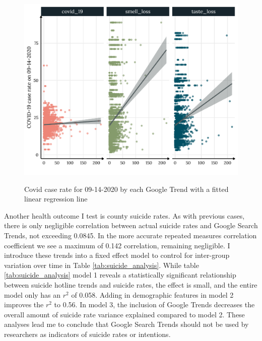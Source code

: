 
\begin{figure}[h]
{\centering \includegraphics[width=0.8\linewidth]{figs/paper1/covid_plot-1.pdf}}
\caption{Covid case rate for 09-14-2020 by each Google Trend with a fitted linear regression line}\label{fig:covid_plot-1}
\end{figure}

Another health outcome I test is county suicide rates. As with previous cases,
there is only negligible correlation between actual suicide rates and Google
Search Trends, not exceeding 0.0845. In the more accurate repeated measures
correlation coefficient we see a maximum of 0.142 correlation, remaining
negligible. I introduce these trends into a fixed effect model to control for
inter-group variation over time in Table \ref{tab:suicide_analysis}. While table
\ref{tab:suicide_analysis} model 1 reveals a statistically significant
relationship between suicide hotline trends and suicide rates, the effect is
small, and the entire model only has an $r^2$ of 0.058. Adding in demographic
features in model 2 improves the $r^2$ to 0.56. In model 3, the inclusion of
Google Trends decreases the overall amount of suicide rate variance explained
compared to model 2. These analyses lead me to conclude that Google Search
Trends should not be used by researchers as indicators of suicide rates or
intentions.

